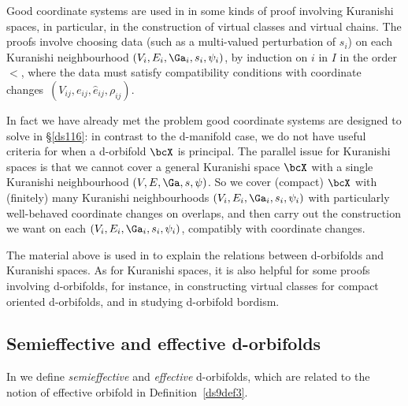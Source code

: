 \documentclass{article}
\begin{document}
Good coordinate systems are used in \cite{FuOn,FOOO} in some kinds
of proof involving Kuranishi spaces, in particular, in the
construction of virtual classes and virtual
chains. The proofs involve choosing data (such as a
multi-valued perturbation of $s_i$) on each Kuranishi neighbourhood
$(V_i,E_i,\Ga_i,s_i,\psi_i)$, by induction on $i$ in $I$ in the
order $<$, where the data must satisfy compatibility conditions with
coordinate changes~$(V_{ij},e_{ij},\hat e_{ij},\rho_{ij})$.

In fact we have already met the problem good coordinate systems are
designed to solve in \S\ref{ds116}: in contrast to the d-manifold
case, we do not have useful criteria for when a d-orbifold $\bcX$ is
principal. The
parallel issue for Kuranishi spaces is that we cannot cover a
general Kuranishi space $\bcX$ with a single Kuranishi neighbourhood
$(V,E,\Ga,s,\psi)$. So we cover (compact) $\bcX$ with (finitely)
many Kuranishi neighbourhoods $(V_i,E_i,\Ga_i,s_i,\psi_i)$ with
particularly well-behaved coordinate changes on overlaps, and then
carry out the construction we want on each
$(V_i,E_i,\Ga_i,s_i,\psi_i)$, compatibly with coordinate changes.

The material above is used in \cite[\S 14.3]{Joyc6} to explain the
relations between d-orbifolds and Kuranishi spaces. As for
Kuranishi spaces, it is also helpful for some proofs involving
d-orbifolds, for instance, in constructing virtual classes for compact oriented d-orbifolds, and in
studying d-orbifold bordism.

\subsection{Semieffective and effective d-orbifolds}
\label{ds1110}

In \cite[\S 10.9]{Joyc6} we define {\it semieffective\/} and {\it
effective\/} d-orbifolds, which are related to the notion of
effective orbifold in Definition~\ref{ds9def3}.
\end{document}
